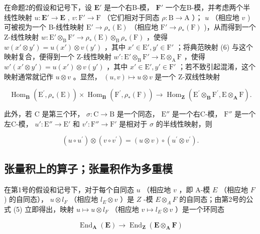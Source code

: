 在命题2的假设和记号下，设 \(\mathbf{E}'\) 是一个右B-模， \(\mathbf{F}'\) 一个左B-模，并考虑两个半线性映射 \(u: \mathbf{E}' \to \mathbf{E}\) , \(v: \mathrm{F}' \to \mathrm{F}\) （它们相对于同态 \(\rho: \mathrm{B} \to \mathrm{A}\) ）； \(u\) （相应地 \(v\) ) 可被视为一个 B-线性映射 \(\mathrm{E}' \to \rho_*(\mathrm{E})\) （相应地 \(\mathrm{F}' \to \rho_*(\mathrm{F})\) )，从而得到一个 Z-线性映射 \(w: \mathrm{E}' \otimes_{\mathrm{B}} \mathrm{F}' \to \rho_*(\mathrm{E}) \otimes_{\mathrm{B}} \rho_*(\mathrm{F})\) ，使得 \(w(x' \otimes y') = u(x') \otimes v(y')\) ，其中 \(x' \in \mathrm{E}', y' \in \mathrm{F}'\) ；将典范映射 (6) 与这个映射复合，便得到一个 Z-线性映射 \(w': \mathrm{E}' \otimes_{\mathrm{B}} \mathrm{F}' \to \mathrm{E} \otimes_{\mathrm{A}} \mathrm{F}\) ，使得 \(w'(x' \otimes y') = u(x') \otimes v(y')\) ，其中 \(x' \in \mathrm{E}', y' \in \mathrm{F}'\) ；若不致引起混淆，这个映射通常就记作 \(u \otimes v\) 。显然， \((u, v) \mapsto u \otimes v\) 是一个 Z-双线性映射

\[
\operatorname{Hom} _ {\mathbf {B}} \left(\mathrm{E} ^ {\prime}, \rho_ {*} (\mathrm{E})\right) \times \operatorname{Hom} _ {\mathbf {B}} \left(\mathrm{F} ^ {\prime}, \rho_ {*} (\mathrm{F})\right)\rightarrow \operatorname{Hom} _ {\mathbf {Z}} \left(\mathrm{E} ^ {\prime} \otimes_ {\mathbf {B}} \mathrm{F} ^ {\prime}, \mathrm{E} \otimes_ {\mathbf {A}} \mathrm{F}\right).
\]

此外，若 C 是第三个环， \(\sigma: \mathrm{C} \to \mathrm{B}\) 是一个同态， \(\mathrm{E}''\) 是一个右C-模， \(\mathrm{F}''\) 是一个左C-模， \(u': \mathrm{E}'' \to \mathrm{E}'\) 和 \(v': \mathrm{F}'' \to \mathrm{F}'\) 是相对于 \(\sigma\) 的半线性映射，则

\[
(u \circ u ^ {\prime}) \otimes (v \circ v ^ {\prime}) = (u \otimes v) \circ (u ^ {\prime} \otimes v ^ {\prime}).
\]

\subsection{张量积上的算子；张量积作为多重模}

在第1号的假设和记号下，对于每个自同态 \(u\) （相应地 \(v\) ，即 A-模 \(E\) （相应地 \(F\) ) 的自同态）， \(u \otimes l_F\) （相应地 \(l_E \otimes v\) ）是 \(Z\) -模 \(E \otimes_A F\) 的自同态；由第2号的公式 (5) 立即得出，映射 \(u \mapsto u \otimes l_F\) （相应地 \(v \mapsto l_E \otimes v\) ）是一个环同态

\[
\operatorname{End} _ {\mathbf {A}} (\mathbf {E}) \rightarrow \operatorname{End} _ {\mathbf {Z}} (\mathbf {E} \otimes_ {\mathbf {A}} \mathbf {F})
\]

